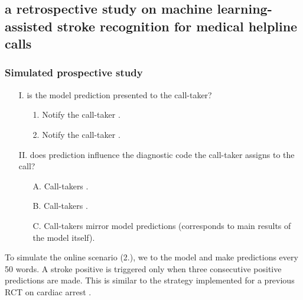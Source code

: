 

\subsection[A Retrospective Study on Machine Learning-Assisted Stroke Recognition for Medical Helpline Calls]{a retrospective study on machine learning-assisted stroke recognition for medical helpline calls}


\begin{frame}
    \frametitle{Simulated prospective study}
    \begin{enumerate}
        \item[I.]  is the model prediction presented to the call-taker?
        \begin{enumerate}
            \item[1.] Notify the call-taker .
            \item[2.] Notify the call-taker .
        \end{enumerate}
        \item[II.]  does prediction influence the diagnostic code the call-taker assigns to the call?
        \begin{enumerate}[label=\Alph*.]
            \item[A.] Call-takers .
            \item[B.] Call-takers .
            \item[C.] Call-takers mirror model predictions (corresponds to main results of the model itself).
        \end{enumerate}
    \end{enumerate}
    \vspace{0.5em}
    To simulate the online scenario (2.), we  to the model and make predictions every 50 words. 
    A stroke positive is triggered only when three consecutive positive predictions are made. 
    This is similar to the strategy implemented for a previous RCT on cardiac arrest \cite{cite15}.

        

\end{frame}
